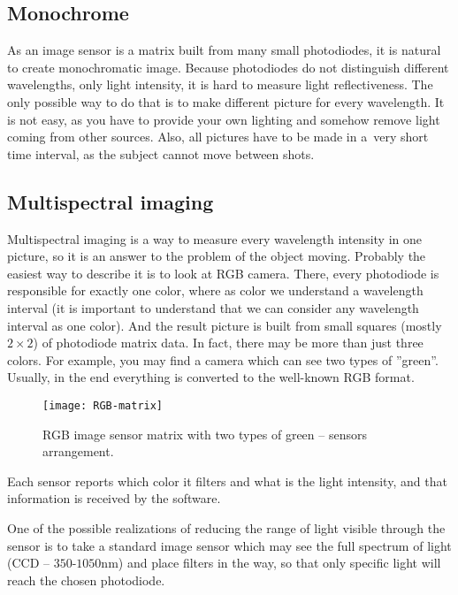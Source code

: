         \subsection*{Monochrome}
            As an image sensor is a matrix built from many small photodiodes,
            it is natural to create monochromatic image.
            Because photodiodes do not distinguish different
            wavelengths, only light intensity, it is hard
            to measure light reflectiveness.
            The only possible way to do that is to
            make different picture for every wavelength.
            It is not easy, as you have to
            provide your own lighting and somehow remove
            light coming from other sources.
            Also, all pictures have to be made in
            a~very short time interval, as the subject
            cannot move between shots.

        \subsection*{Multispectral imaging}
            Multispectral imaging is a way to measure every wavelength intensity
            in one picture, so it is an answer to the problem of the object moving.
            Probably the easiest way to describe it is to look at RGB camera.
            There, every photodiode is responsible for exactly one color,
            where as color we understand a wavelength interval (it is important
            to understand that we can consider any wavelength interval as one color).
            And the result picture is built from small squares (mostly $2 \times 2$)
            of photodiode matrix data.
            In fact, there may be more than just three colors.
            For example, you may find a camera which can see two types of ''green''.
            Usually, in the end everything is converted to the well-known RGB format.

            \begin{figure}[H]
                \caption{RGB image sensor matrix with two types of green -- sensors arrangement.}
                \centering
                \texttt{[image: RGB-matrix]}
                \label{fig:RGB-matrix}
            \end{figure}

            Each sensor reports which color it filters and what is the light intensity,
            and that information is received by the software.

            One of the possible realizations of reducing the range
            of light visible through the sensor is to take a standard image sensor which
            may see the full spectrum of light (CCD -- $350$-$1050$nm) and place filters
            in the way, so that only specific light will reach the chosen photodiode.

